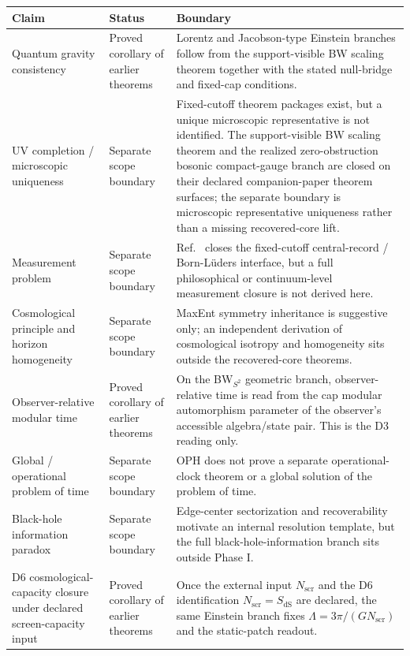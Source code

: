 \begin{center}
\scriptsize
\setlength{\tabcolsep}{3pt}
\begin{tabular}{@{}>{\raggedright\arraybackslash}p{}>{\raggedright\arraybackslash}p{}>{\raggedright\arraybackslash}p{}@{}}
\toprule
Claim & Status & Boundary \\
\midrule
Quantum gravity consistency & Proved corollary of earlier theorems & Lorentz and Jacobson-type Einstein branches follow from the support-visible BW scaling theorem together with the stated null-bridge and fixed-cap conditions. \\
UV completion / microscopic uniqueness & Separate scope boundary & Fixed-cutoff theorem packages exist, but a unique microscopic representative is not identified. The support-visible BW scaling theorem and the realized zero-obstruction bosonic compact-gauge branch are closed on their declared companion-paper theorem surfaces; the separate boundary is microscopic representative uniqueness rather than a missing recovered-core lift. \\
Measurement problem & Separate scope boundary & Ref.~\cite{ophmicrophysics} closes the fixed-cutoff central-record / Born-L\"uders interface, but a full philosophical or continuum-level measurement closure is not derived here. \\
Cosmological principle and horizon homogeneity & Separate scope boundary & MaxEnt symmetry inheritance is suggestive only; an independent derivation of cosmological isotropy and homogeneity sits outside the recovered-core theorems. \\
Observer-relative modular time & Proved corollary of earlier theorems & On the BW\(_{S^2}\) geometric branch, observer-relative time is read from the cap modular automorphism parameter of the observer's accessible algebra/state pair. This is the D3 reading only. \\
Global / operational problem of time & Separate scope boundary & OPH does not prove a separate operational-clock theorem or a global solution of the problem of time. \\
Black-hole information paradox & Separate scope boundary & Edge-center sectorization and recoverability motivate an internal resolution template, but the full black-hole-information branch sits outside Phase I. \\
D6 cosmological-capacity closure under declared screen-capacity input & Proved corollary of earlier theorems & Once the external input \(N_{\mathrm{scr}}\) and the D6 identification \(N_{\mathrm{scr}}=S_{\mathrm{dS}}\) are declared, the same Einstein branch fixes \(\Lambda=3\pi/(G N_{\mathrm{scr}})\) and the static-patch readout. \\

\end{tabular}
\end{center}
